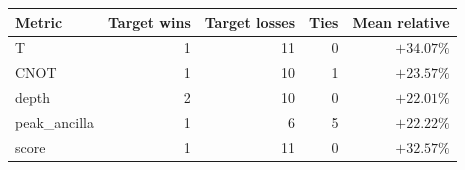 \begin{tabular}{lrrrr}
\toprule
Metric & Target wins & Target losses & Ties & Mean relative \\
\midrule
T & 1 & 11 & 0 & $+34.07\%$ \\
CNOT & 1 & 10 & 1 & $+23.57\%$ \\
depth & 2 & 10 & 0 & $+22.01\%$ \\
peak_ancilla & 1 & 6 & 5 & $+22.22\%$ \\
score & 1 & 11 & 0 & $+32.57\%$ \\
\bottomrule
\end{tabular}

